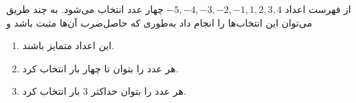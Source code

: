 \EXERCISE
از فهرست اعداد
$-5, -4, -3, -2, -1, 1, 2, 3, 4$
چهار عدد انتخاب می‌شود. به چند طریق می‌توان این انتخاب‌ها را انجام داد به‌طوری که حاصل‌ضرب آن‌ها مثبت باشد و
\begin{enumerate}
\item
این اعداد متمایز باشند.
\item
هر عدد را بتوان تا چهار بار انتخاب کرد.
\item
هر عدد را بتوان حداکثر
$3$
بار انتخاب کرد.
\end{enumerate}